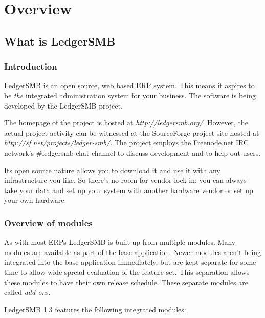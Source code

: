 
\part{Overview}

\chapter{What is LedgerSMB}

\section{Introduction}
LedgerSMB is an open source, web based ERP system. This means it aspires to be
\textit{the} integrated administration system for your business.
The software is being developed by the LedgerSMB project.

The homepage of the project is hosted at \textit{http://ledgersmb.org/}.
However, the actual project activity can be witnessed at the SourceForge
project site hosted at \textit{http://sf.net/projects/ledger-smb/}.  The project
employs the Freenode.net IRC network's \#ledgersmb chat channel to discuss development
and to help out users.

Its open source nature allows you to download it and use it with any
infrastructure you like. So there's no room for vendor lock-in: you can
always take your data and set up your system with another hardware vendor
or set up your own hardware.

\section{Overview of modules}
\label{sec:ModuleOverview}
As with most ERPs LedgerSMB is built up from multiple modules.  Many modules are
available as part of the base application.  Newer modules aren't being integrated
into the base application immediately, but are kept separate for some time to allow
wide spread evaluation of the feature set.  This separation allows these modules
to have their own release schedule.  These separate modules are called \textit{add-on}s.

LedgerSMB 1.3 features the following integrated modules:

